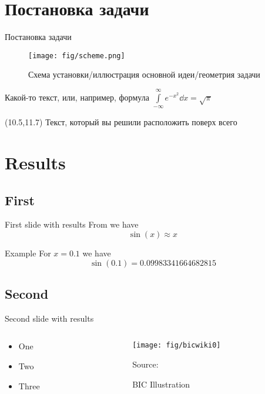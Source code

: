 \documentclass[
aspectratio=169,
16pt,
xcolor={dvipsnames} %
]{beamer}
\newcommand{\red}[1]{\textcolor{BrickRed}{#1}}
\begin{document}
\section{Постановка задачи}
\begin{frame}[t]{Постановка задачи}
	\begin{figure}
      
				\texttt{[image: fig/scheme.png]}
				\caption{Схема установки/иллюстрация основной идеи/геометрия задачи~}
	\end{figure}
	Какой-то текст, или, например, формула $\int\limits_{-\infty}^\infty  e^{-x^2} \dd x=\sqrt\pi$
	\begin{textblock}{0.5}(10.5,11.7)
		 \large{\red{Текст, который вы решили расположить поверх всего}}
	\end{textblock}
\end{frame}



\section{Results}
\subsection{First}
\begin{frame}[t]{First slide with results}
	From  we have
	\[
		\sin(x) \approx x
	\]
	\begin{block}{Example}
		For $x = 0.1$ we have 
		\[
			\sin (0.1) = 0.09983341664682815
		\]
	\end{block}
\end{frame}

\subsection{Second}
\begin{frame}[t]{Second slide with results}
	\begin{columns}
		\begin{column}{0.4\linewidth}
			\begin{itemize}
				\item One
				\item Two
				\item Three				
			\end{itemize}
		\end{column}
		\begin{column}{0.4\linewidth}
			\begin{figure}
				\texttt{[image: fig/bicwiki0]}
				\caption{BIC Illustration}
				 {\raggedright\tiny Source:\par}
			\end{figure}
		\end{column}
	\end{columns}
\end{frame}
\end{document}
